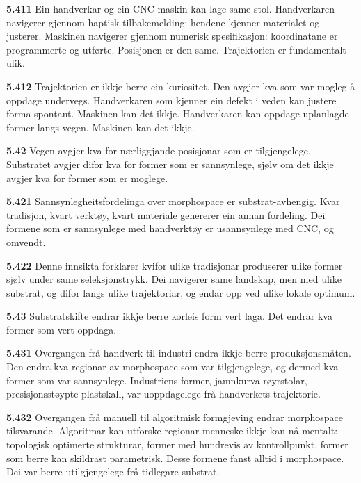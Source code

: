 \documentclass[11pt, a4paper]{article}
\newcommand{\subprop}[1]{\medskip\noindent\textbf{#1}\quad}
\begin{document}
\subprop{5.411} Ein handverkar og ein CNC-maskin kan lage same stol. Handverkaren navigerer gjennom haptisk tilbakemelding: hendene kjenner materialet og justerer. Maskinen navigerer gjennom numerisk spesifikasjon: koordinatane er programmerte og utf\o rte. Posisjonen er den same. Trajektorien er fundamentalt ulik.

\subprop{5.412} Trajektorien er ikkje berre ein kuriositet. Den avgjer kva som var mogleg \aa{} oppdage undervegs. Handverkaren som kjenner ein defekt i veden kan justere forma spontant. Maskinen kan det ikkje. Handverkaren kan oppdage uplanlagde former langs vegen. Maskinen kan det ikkje.

\subprop{5.42} Vegen avgjer kva for n\ae rliggjande posisjonar som er tilgjengelege. Substratet avgjer difor kva for former som er sannsynlege, sj\o lv om det ikkje avgjer kva for former som er moglege.

\subprop{5.421} Sannsynlegheitsfordelinga over morphospace er substrat-avhengig. Kvar tradisjon, kvart verkt\o y, kvart materiale genererer ein annan fordeling. Dei formene som er sannsynlege med handverkt\o y er usannsynlege med CNC, og omvendt.

\subprop{5.422} Denne innsikta forklarer kvifor ulike tradisjonar produserer ulike former sj\o lv under same seleksjonstrykk. Dei navigerer same landskap, men med ulike substrat, og difor langs ulike trajektoriar, og endar opp ved ulike lokale optimum.

\subprop{5.43} Substratskifte endrar ikkje berre korleis form vert laga. Det endrar kva former som vert oppdaga.

\subprop{5.431} Overgangen fr\aa{} handverk til industri endra ikkje berre produksjonsm\aa ten. Den endra kva regionar av morphospace som var tilgjengelege, og dermed kva former som var sannsynlege. Industriens former, jamnkurva r\o yrstolar, presisjonsst\o ypte plastskall, var uoppdagelege fr\aa{} handverkets trajektorie.

\subprop{5.432} Overgangen fr\aa{} manuell til algoritmisk formgjeving endrar morphospace tilsvarande. Algoritmar kan utforske regionar menneske ikkje kan n\aa{} mentalt: topologisk optimerte strukturar, former med hundrevis av kontrollpunkt, former som berre kan skildrast parametrisk. Desse formene fanst alltid i morphospace. Dei var berre utilgjengelege fr\aa{} tidlegare substrat.


\end{document}
